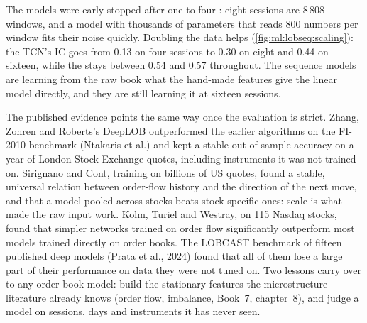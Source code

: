 The models were early-stopped after one to four : eight sessions are 8\,808 windows, and a model with thousands
of parameters that reads 800 numbers per window fits their noise quickly. Doubling the data helps (\cref{fig:ml:lobseq:scaling}):
the TCN's IC goes from 0.13 on four sessions to 0.30 on eight and 0.44 on sixteen, while the  stays
between 0.54 and 0.57 throughout. The sequence models are learning from the raw book what the hand-made features give the
linear model directly, and they are still learning it at sixteen sessions.

\begin{omfigure}

\label{fig:ml:lobseq:scaling}
\end{omfigure}

The published evidence points the same way once the evaluation is strict. Zhang, Zohren and Roberts's DeepLOB outperformed
the earlier algorithms on the FI-2010 benchmark (Ntakaris et al.) and kept a stable out-of-sample accuracy on a year of
London Stock Exchange quotes, including instruments it was not trained on. Sirignano and Cont, training on
billions of US quotes, found a stable, universal relation between order-flow history and the direction of the next
move, and that a model pooled across stocks beats stock-specific ones: scale is what made the raw input work. Kolm,
Turiel and Westray, on 115 Nasdaq stocks, found that simpler networks trained on order flow significantly outperform
most models trained directly on order books. The LOBCAST benchmark of fifteen published deep models (Prata et al., 2024)
found that all of them lose a large part of their performance on data they were not tuned on. Two lessons carry over to
any order-book model: build the stationary features the microstructure literature already knows (order flow, imbalance,
Book~7, chapter~8), and judge a model on sessions, days and instruments it has never seen.

